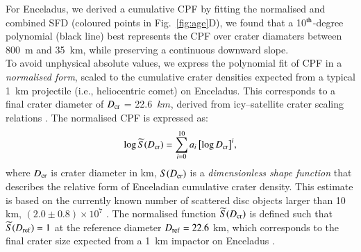 \documentclass[preprint,11pt,3p,times,authoryear]{elsarticle}
\begin{document}
{For Enceladus, we derived a cumulative CPF by fitting the normalised and combined SFD (coloured points in Fig.~\ref{fig:age}D), we found that a 10$^{\rm th}$-degree polynomial (black line) best represents the CPF over crater diamaters between 800~m and 35~km, while preserving a continuous downward slope. \\

To avoid unphysical absolute values, we express the polynomial fit of CPF in a \emph{normalised form}, scaled to the cumulative crater densities expected from a typical 1~km projectile (i.e., heliocentric comet) on Enceladus. This corresponds to a final crater diameter of $D_{\rm cr}$ = 22.6~$km$, derived from icy–satellite crater scaling relations \citep[e.g.,][]{Zahnle2003}. The normalised CPF is expressed as:
\begin{equation}
    \log \widetilde{S}(D_{\rm cr}) = \sum_{i=0}^{10} a_i \, \bigl[\log D_{\rm cr}\bigr]^i,
    \label{equ:cpf_scale}
\end{equation}
where $D_{\rm cr}$ is crater diameter in km, $S(D_{\rm cr})$ is a \emph{dimensionless shape function} that describes the relative form of Enceladian cumulative crater density.
This estimate is based on the currently known number of scattered disc objects larger than 10 km, $(2.0 \pm 0.8) \times 10^{7}$ \citep{Nesvorny2019}. The normalised function $\widetilde{S}(D_{\rm cr})$ is defined such that $\widetilde{S}(D_{\rm ref}) = 1$ at the reference diameter $D_{\rm ref} = 22.6$ km, which corresponds to the final crater size expected from a 1~km impactor on Enceladus \citep{Zahnle2003,Wong2023}. \\

}
\end{document}
